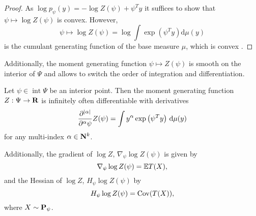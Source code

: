 \begin{proof}
    As $\log p_{\psi}(y) = - \log Z(\psi) + \psi^{T} y$ it suffices to show that $\psi \mapsto \log Z(\psi)$ is convex. However, 
    $$\psi \mapsto \log Z(\psi) = \log \int \exp \left( \psi^{T}y \right) \mathrm d \mu(y)$$ is the cumulant generating function of the base measure $\mu$, which is convex \citep[p. 144f]{Billingsley1995Probabilitya}.
\end{proof}

Additionally, the moment generating function $\psi \mapsto Z(\psi)$ is smooth on the interior of $\Psi$ and allows to switch the order of integration and differentiation.
\begin{theorem}
    \label{thm:logZsmooth}
    Let $\psi \in \operatorname{int} \Psi$ be an interior point. Then the moment generating function $Z: \Psi \to \R$ is infinitely often differentiable with derivatives 
    $$
        \frac{\partial^{\lvert \alpha \rvert}}{\partial^{\alpha}\psi} Z(\psi) = \int y^{\alpha} \exp \left( \psi^{T} y \right) \d \mu(y)
    $$
    for any multi-index $\alpha \in \N^{k}$.

    Additionally, the gradient of $\log Z$, $\nabla_{\psi} \log Z(\psi)$ is given by
    $$
        \nabla_{\psi} \log Z(\psi) = \E T(X),
    $$
    and the Hessian of $\log Z$, $H_{\psi} \log Z(\psi)$ by
    $$
        H_{\psi} \log Z(\psi) = \cov (T(X)),
    $$
    where $X \sim \P_{\psi}$.
    
\end{theorem}


